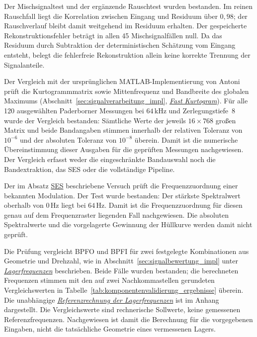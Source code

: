 Der Mischsignaltest und der ergänzende Rauschtest wurden bestanden. Im
reinen Rauschfall liegt die Korrelation zwischen Eingang und Residuum über
$0{,}98$; der Rauschverlauf bleibt damit weitgehend im Residuum erhalten.
Der gespeicherte Rekonstruktionsfehler beträgt in allen 45 Mischsignalfällen
null. Da das Residuum durch Subtraktion der deterministischen Schätzung vom
Eingang entsteht, belegt die fehlerfreie Rekonstruktion allein keine korrekte
Trennung der Signalanteile.


Der Vergleich mit der ursprünglichen MATLAB-Implementierung von Antoni
prüft die Kurtogrammmatrix sowie Mittenfrequenz und Bandbreite des globalen
Maximums (Abschnitt~\ref{sec:signalverarbeitung_impl},
\hyperref[subsec:fast_kurtogram_impl]{\emph{Fast Kurtogram}}).
Für alle 120 ausgewählten
Paderborner Messungen bei $64\,\mathrm{kHz}$ und Zerlegungstiefe~8 wurde der
Vergleich bestanden: Sämtliche Werte der jeweils $16\times768$ großen Matrix
und beide Bandangaben stimmen innerhalb der relativen Toleranz von $10^{-6}$
und der absoluten Toleranz von $10^{-8}$ überein. Damit ist die numerische
Übereinstimmung dieser Ausgaben für die geprüften Messungen nachgewiesen.
Der Vergleich erfasst weder die eingeschränkte Bandauswahl noch die
Bandextraktion, das SES oder die vollständige Pipeline.


Der im Absatz \hyperref[subsec:ses_impl]{SES} beschriebene Versuch prüft die
Frequenzzuordnung einer bekannten Modulation. Der Test wurde bestanden:
Der stärkste Spektralwert oberhalb von $0\,\mathrm{Hz}$ liegt bei
$64\,\mathrm{Hz}$. Damit ist die Frequenzzuordnung für diesen genau auf dem
Frequenzraster liegenden Fall nachgewiesen. Die absoluten Spektralwerte und
die vorgelagerte Gewinnung der Hüllkurve werden damit nicht geprüft.


Die Prüfung vergleicht BPFO und BPFI für zwei festgelegte Kombinationen aus
Geometrie und Drehzahl, wie in Abschnitt~\ref{sec:signalbewertung_impl} unter
\hyperref[subsec:lagerfrequenzen_impl]{\emph{Lagerfrequenzen}} beschrieben.
Beide Fälle wurden bestanden;
die berechneten Frequenzen stimmen mit den auf zwei Nachkommastellen
gerundeten Vergleichswerten in
Tabelle~\ref{tab:komponentenvalidierung_ergebnisse} überein. Die unabhängige
\hyperref[app:lagerfrequenz_referenzrechnung]
{\emph{Referenzrechnung der Lagerfrequenzen}} ist im Anhang dargestellt.
Die Vergleichswerte sind rechnerische Sollwerte, keine gemessenen Referenzfrequenzen.
Nachgewiesen ist damit die Berechnung für die vorgegebenen Eingaben,
nicht die tatsächliche Geometrie eines vermessenen Lagers.

